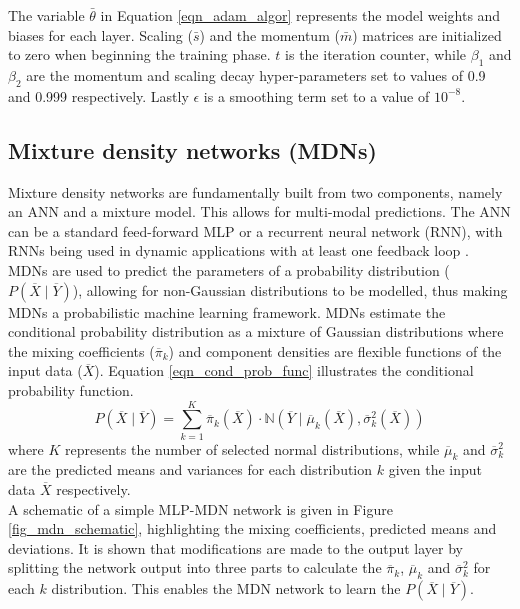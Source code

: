 \documentclass[a4paper,fleqn]{cas-dc}
\begin{document}
The variable $\bar{\theta}$ in Equation \ref{eqn_adam_algor} represents the model weights and biases for each layer. Scaling ($\bar{s}$) and the momentum ($\bar{m}$) matrices are initialized to zero when beginning the training phase. $t$ is the iteration counter, while $\beta_1$ and $\beta_2$ are the momentum and scaling decay hyper-parameters set to values of 0.9 and 0.999 respectively. Lastly $\epsilon$ is a smoothing term set to a value of $10^{-8}$.

\subsection{Mixture density networks (MDNs)}
Mixture density networks are fundamentally built from two components, namely an ANN and a mixture model. This allows for multi-modal predictions. The ANN can be a standard feed-forward MLP or a recurrent neural network (RNN), with RNNs being used in dynamic applications with at least one feedback loop \citep{Oko2015}.\\

MDNs are used to predict the parameters of a probability distribution ($P(\overline{X}\mid\overline{Y})$), allowing for non-Gaussian distributions to be modelled, thus making MDNs a probabilistic machine learning framework. MDNs estimate the conditional probability distribution as a mixture of Gaussian distributions where the mixing coefficients ($\overline{\pi}_k$) and component densities are flexible functions of the input data ($\overline{X}$). Equation \ref{eqn_cond_prob_func} illustrates the conditional probability function.
\begin{equation}\label{eqn_cond_prob_func}
P(\overline{X}\mid\overline{Y}) = \sum_{k=1}^K\overline{\pi}_k(\overline{X})\cdot \mathbb{N}(\overline{Y}\mid \overline{\mu}_k(\overline{X}),\overline{\sigma}^2_k(\overline{X}))
\end{equation}
where $K$ represents the number of selected normal distributions, while $\overline{\mu}_k$ and $\overline{\sigma}^2_k$ are the predicted means and variances for each distribution $k$ given the input data $\overline{X}$ respectively.\\

A schematic of a simple MLP-MDN network is given in Figure \ref{fig_mdn_schematic}, highlighting the mixing coefficients, predicted means and deviations. It is shown that modifications are made to the output layer by splitting the network output into three parts to calculate the $\overline{\pi}_k$, $\overline{\mu}_k$ and $\overline{\sigma}^2_k$ for each $k$ distribution. This enables the MDN network to learn the $P(\overline{X}\mid\overline{Y})$.\\
\end{document}
